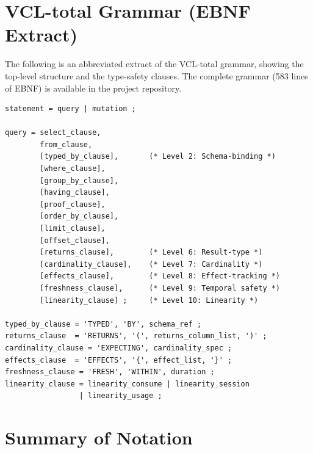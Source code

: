 \documentclass[11pt,a4paper]{article}
\begin{document}
\appendix

\section{VCL-total Grammar (EBNF Extract)}\label{app:grammar}

The following is an abbreviated extract of the VCL-total grammar,
showing the top-level structure and the type-safety clauses.  The
complete grammar (583 lines of EBNF) is available in the project
repository.

\begin{lstlisting}[language={},basicstyle=\footnotesize\ttfamily,
  backgroundcolor=\color{bglight},frame=single]
statement = query | mutation ;

query = select_clause,
        from_clause,
        [typed_by_clause],       (* Level 2: Schema-binding *)
        [where_clause],
        [group_by_clause],
        [having_clause],
        [proof_clause],
        [order_by_clause],
        [limit_clause],
        [offset_clause],
        [returns_clause],        (* Level 6: Result-type *)
        [cardinality_clause],    (* Level 7: Cardinality *)
        [effects_clause],        (* Level 8: Effect-tracking *)
        [freshness_clause],      (* Level 9: Temporal safety *)
        [linearity_clause] ;     (* Level 10: Linearity *)

typed_by_clause = 'TYPED', 'BY', schema_ref ;
returns_clause  = 'RETURNS', '(', returns_column_list, ')' ;
cardinality_clause = 'EXPECTING', cardinality_spec ;
effects_clause  = 'EFFECTS', '{', effect_list, '}' ;
freshness_clause = 'FRESH', 'WITHIN', duration ;
linearity_clause = linearity_consume | linearity_session
                 | linearity_usage ;
\end{lstlisting}

\section{Summary of Notation}\label{app:notation}
\end{document}
